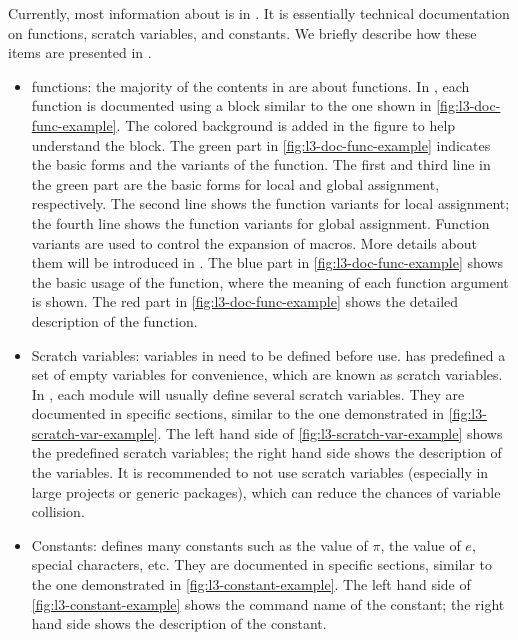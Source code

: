 \documentclass{ltugboat}
\begin{document}
Currently, most information about \LTT{} is in \cite{l3interface}. 
It is essentially technical documentation on \LTT{} functions, scratch variables, and constants. 
We briefly describe how these items are presented in \cite{l3interface}.
\begin{itemize}
\item \LTT{} functions: the majority of the contents in \cite{l3interface} are about \LTT{} functions.
In \cite{l3interface}, each function is documented using a block similar to the one shown in  \cref{fig:l3-doc-func-example}.
The colored background is added in the figure to help understand the block.
The green part in \cref{fig:l3-doc-func-example} indicates the basic forms and the variants of the function. 
The first and third line in the green part are the basic forms for local and global assignment, respectively.
The second line shows the function variants for local assignment; the fourth line shows the function variants for global assignment.
Function variants are used to control the expansion of macros. 
More details about them will be introduced in .
The blue part in \cref{fig:l3-doc-func-example} shows the basic usage of the function, where the meaning of each function argument is shown.
The red part in \cref{fig:l3-doc-func-example} shows the detailed description of the function.

\item Scratch variables: variables in \LTT{} need to be defined before use. 
\LTT{} has predefined a set of empty variables for convenience, which are known as scratch variables.
In \LTT{}, each module will usually define several scratch variables.
They are documented in specific sections, similar to the one demonstrated in \cref{fig:l3-scratch-var-example}.
The left hand side of \cref{fig:l3-scratch-var-example} shows the predefined scratch variables; the right hand side shows the description of the variables.
It is recommended to not use scratch variables (especially in large projects or generic packages), which can reduce the chances of variable collision.

\item Constants: \LTT{} defines many constants such as the value of $\pi$, the value of $e$, special characters, etc. 
They are documented in specific sections, similar to the one demonstrated in \cref{fig:l3-constant-example}.
The left hand side of \cref{fig:l3-constant-example} shows the command name of the constant; the right hand side shows the description of the constant.

\end{itemize}
\end{document}
